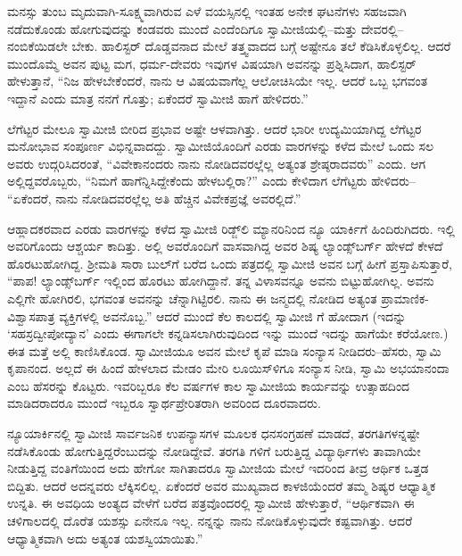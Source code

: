 ಮನಸ್ಸು ತುಂಬ ಮೃದುವಾಗಿ-ಸೂಕ್ಷ್ಮವಾಗಿರುವ ಎಳೆ ವಯಸ್ಸಿನಲ್ಲಿ ಇಂತಹ ಅನೇಕ ಘಟನೆಗಳು ಸಹಜವಾಗಿ ನಡೆದುಕೊಂಡು ಹೋಗುವುದನ್ನು ಕಂಡವರು ಮುಂದೆ ಎಂದೆಂದಿಗೂ ಸ್ವಾಮೀಜಿಯಲ್ಲಿ–ಮತ್ತು ದೇವರಲ್ಲಿ–ನಂಬಿಕೆಯಿಡಲೇ ಬೇಕು. ಹಾಲಿಸ್ಟರ್ ದೊಡ್ಡವನಾದ ಮೇಲೆ ತತ್ತ್ವವಾದದ ಬಗ್ಗೆ ಅಷ್ಟೇನೂ ತಲೆ ಕೆಡಿಸಿಕೊಳ್ಳಲಿಲ್ಲ. ಆದರೆ ಮುಂದೊಮ್ಮೆ ಅವನ ಪುಟ್ಟ ಮಗ, ಧರ್ಮ-ದೇವರು ಇವುಗಳ ವಿಷಯಾಗಿ ಅವನನ್ನು ಪ್ರಶ್ನಿಸಿದಾಗ, ಹಾಲಿಸ್ಟರ್ ಹೇಳುತ್ತಾನೆ, “ನಿಜ ಹೇಳಬೇಕೆಂದರೆ, ನಾನು ಆ ವಿಷಯವಾಗೆಲ್ಲ ಆಲೋಚಿಸಿಯೇ ಇಲ್ಲ. ಆದರೆ ಒಬ್ಬ ಭಗವಂತ ಇದ್ದಾನೆ ಎಂದು ಮಾತ್ರ ನನಗೆ ಗೊತ್ತು; ಏಕೆಂದರೆ ಸ್ವಾಮೀಜಿ ಹಾಗೆ ಹೇಳಿದರು.”

ಲೆಗೆಟ್ಟರ ಮೇಲೂ ಸ್ವಾಮೀಜಿ ಬೀರಿದ ಪ್ರಭಾವ ಅಷ್ಟೇ ಆಳವಾಗಿತ್ತು. ಆದರೆ ಭಾರೀ ಉದ್ಯಮಿಯಾಗಿದ್ದ ಲೆಗೆಟ್ಟರ ಮನೋಭಾವ ಸಂಪೂರ್ಣ ವಿಭಿನ್ನವಾದದ್ದು. ಸ್ವಾಮೀಜಿಯೊಂದಿಗೆ ಎರಡು ವಾರಗಳನ್ನು ಕಳೆದ ಮೇಲೆ ಒಂದು ಸಲ ಅವರು ಉದ್ಗರಿಸಿದರಂತೆ, “ವಿವೇಕಾನಂದರು ನಾನು ನೋಡಿದವರಲ್ಲೆಲ್ಲ ಅತ್ಯಂತ ಶ್ರೇಷ್ಠರಾದವರು” ಎಂದು. ಆಗ ಅಲ್ಲಿದ್ದವರೊಬ್ಬರು, “ನಿಮಗೆ ಹಾಗೆನ್ನಿಸಿದ್ದೇಕೆಂದು ಹೇಳಬಲ್ಲಿರಾ?” ಎಂದು ಕೇಳಿದಾಗ ಲೆಗೆಟ್ಟರು ಹೇಳಿದರು– “ಏಕೆಂದರೆ, ನಾನು ನೋಡಿದವರಲ್ಲೆಲ್ಲ ಅತಿ ಹೆಚ್ಚಿನ ವಿವೇಕಪ್ರಜ್ಞೆ  ಅವರಲ್ಲಿದೆ.”

ಆಹ್ಲಾದಕರವಾದ ಎರಡು ವಾರಗಳನ್ನು ಕಳೆದ ಸ್ವಾಮೀಜಿ ರಿಡ್ಜ್​ಲಿ ಮ್ಯಾನರಿನಿಂದ ನ್ಯೂ ಯಾರ್ಕಿಗೆ ಹಿಂದಿರುಗಿದರು. ಇಲ್ಲಿ ಅವರಿಗೊಂದು ಆಶ್ಚರ್ಯ ಕಾದಿತ್ತು. ಅಲ್ಲಿ ಅವರೊಂದಿಗೆ ವಾಸವಾಗಿದ್ದ ಅವರ ಶಿಷ್ಯ ಲ್ಯಾಂಡ್ಸ್​ಬರ್ಗ್ ಹೇಳದೆ ಕೇಳದೆ ಹೊರಟುಹೋಗಿದ್ದ. ಶ್ರೀಮತಿ ಸಾರಾ ಬುಲ್​ಗೆ ಬರೆದ ಒಂದು ಪತ್ರದಲ್ಲಿ ಸ್ವಾಮೀಜಿ ಅವನ ಬಗ್ಗೆ ಹೀಗೆ ಪ್ರಸ್ತಾಪಿಸುತ್ತಾರೆ, “ಪಾಪ! ಲ್ಯಾಂಡ್ಸ್​ಬರ್ಗ್ ಇಲ್ಲಿಂದ ಹೊರಟು ಹೋಗಿದ್ದಾನೆ. ತನ್ನ ವಿಳಾಸವನ್ನೂ ಅವನು ಬಿಟ್ಟುಹೋಗಿಲ್ಲ. ಅವನು ಎಲ್ಲಿಗೇ ಹೋಗಿರಲಿ, ಭಗವಂತ ಅವನನ್ನು ಚೆನ್ನಾಗಿಟ್ಟಿರಲಿ. ನಾನು ಈ ಜನ್ಮದಲ್ಲಿ ನೋಡಿದ ಅತ್ಯಂತ ಪ್ರಾಮಾಣಿಕ-ವಿಶ್ವಾಸಪಾತ್ರ ವ್ಯಕ್ತಿಗಳಲ್ಲಿ ಅವನೊಬ್ಬ.” ಆದರೆ ಮುಂದೆ ಕೆಲ ಕಾಲದಲ್ಲಿ ಸ್ವಾಮೀಜಿ ಗೆ ಹೋದಾಗ (ಇದನ್ನು ‘ಸಹಸ್ರದ್ವೀಪೋದ್ಯಾನ’ ಎಂದು ಈಗಾಗಲೇ ಕನ್ನಡಿಸಲಾಗಿರುವುದಿಂದ ಇನ್ನು ಮುಂದೆ ಇದನ್ನು ಹಾಗೆಯೇ ಕರೆಯೋಣ.) ಈತ ಮತ್ತೆ ಅಲ್ಲಿ ಕಾಣಿಸಿಕೊಂಡ. ಸ್ವಾಮೀಜಿಯೂ ಅವನ ಮೇಲೆ ಕೃಪೆ ಮಾಡಿ ಸಂನ್ಯಾಸ ನೀಡಿದರು–ಹೆಸರು, ಸ್ವಾಮಿ ಕೃಪಾನಂದ. ಅಲ್ಲದೆ ಈ ಹಿಂದೆ ಹೇಳಲಾದ ಮೇಡಂ ಮೇರಿ ಲೂಯಿಸ್​ಳಿಗೂ ಸಂನ್ಯಾಸ ನೀಡಿ, ಸ್ವಾಮಿ ಅಭಯಾನಂದಾ ಎಂಬ ಹೆಸರನ್ನು ಕೊಟ್ಟರು. ಇವರಿಬ್ಬರೂ ಕೆಲ ವರ್ಷಗಳ ಕಾಲ ಸ್ವಾಮೀಜಿಯ ಕಾರ್ಯವನ್ನು ಉತ್ಸಾಹದಿಂದ ಮಾಡಿದರಾದರೂ ಮುಂದೆ ಇಬ್ಬರೂ ಸ್ವಾರ್ಥಪ್ರೇರಿತರಾಗಿ ಅವರಿಂದ ದೂರವಾದರು.

ನ್ಯೂಯಾರ್ಕಿನಲ್ಲಿ ಸ್ವಾಮೀಜಿ ಸಾರ್ವಜನಿಕ ಉಪನ್ಯಾಸಗಳ ಮೂಲಕ ಧನಸಂಗ್ರಹಣೆ ಮಾಡದೆ, ತರಗತಿಗಳನ್ನಷ್ಟೇ ನಡೆಸಿಕೊಂಡು ಹೋಗುತ್ತಿದ್ದರೆಂಬುದನ್ನು ನೋಡಿದ್ದೇವೆ. ತರಗತಿ ಗಳಿಗೆ ಬರುತ್ತಿದ್ದ ವಿದ್ಯಾರ್ಥಿಗಳು ತಾವಾಗಿಯೇ ನೀಡುತ್ತಿದ್ದ ವಂತಿಗೆಯಿಂದ ಅದು ಹೇಗೋ ಸಾಗಿತಾದರೂ ಸ್ವಾಮೀಜಿಯ ಮೇಲೆ ಇದರಿಂದ ತೀವ್ರ ಆರ್ಥಿಕ ಒತ್ತಡ ಬಿದ್ದಿತು. ಆದರೆ ಅದನ್ನವರು ಲೆಕ್ಕಿಸಲಿಲ್ಲ. ಏಕೆಂದರೆ ಅವರ ಮುಖ್ಯವಾದ ಕಾಳಜಿಯೆಂದರೆ ತಮ್ಮ ಶಿಷ್ಯರ ಆಧ್ಯಾತ್ಮಿಕ ಉನ್ನತಿ. ಈ ಅವಧಿಯ ಅಂತ್ಯದ ವೇಳೆಗೆ ಬರೆದ ಪತ್ರವೊಂದರಲ್ಲಿ ಸ್ವಾಮೀಜಿ ಹೇಳುತ್ತಾರೆ, “ಆರ್ಥಿಕವಾಗಿ ಈ ಚಳಿಗಾಲದಲ್ಲಿ ದೊರೆತ ಯಶಸ್ಸು ಏನೇನೂ ಇಲ್ಲ. ನನ್ನನ್ನು ನಾನು ನೋಡಿಕೊಳ್ಳುವುದೇ ಕಷ್ಟವಾಗಿತ್ತು. ಆದರೆ ಆಧ್ಯಾತ್ಮಿಕವಾಗಿ ಅದು ಅತ್ಯಂತ ಯಶಸ್ವಿಯಾಯಿತು.”

